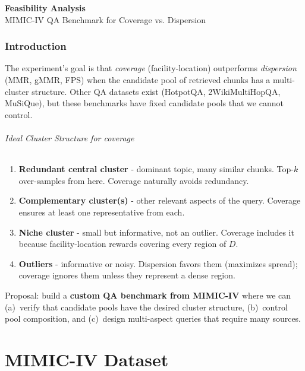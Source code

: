 \documentclass[11pt,a4paper]{article}
\begin{document}
\begin{center}
	{\huge \textbf{Feasibility Analysis}}\\[1em]
	{\Large MIMIC-IV QA Benchmark for Coverage vs. Dispersion}\\[4em]
\end{center}

\tableofcontents
\newpage

\section{Introduction}
\label{sec:introduction}

The experiment's goal is that \emph{coverage} (facility-location) outperforms \emph{dispersion} (MMR, gMMR, FPS) when the candidate pool of retrieved chunks has a multi-cluster structure. Other QA datasets exist (HotpotQA, 2WikiMultiHopQA, MuSiQue), but these benchmarks have fixed candidate pools that we cannot control.

\paragraph{Ideal Cluster Structure for coverage}
\begin{enumerate}[leftmargin=*]
	\item \textbf{Redundant central cluster} - dominant topic, many similar chunks. Top-$k$ over-samples from here.  Coverage naturally avoids redundancy.
	\item \textbf{Complementary cluster(s)} - other relevant aspects of the query. Coverage ensures at least one representative from each.
	\item \textbf{Niche cluster} - small but informative, not an outlier. Coverage includes it because facility-location rewards covering every region of $D$.
	\item \textbf{Outliers} - informative or noisy.  Dispersion favors them (maximizes spread); coverage ignores them unless they represent a dense region.
\end{enumerate}

Proposal: build a \textbf{custom QA benchmark from MIMIC-IV} where we can (a)~verify that candidate pools have the desired cluster structure, (b)~control pool composition, and (c)~design multi-aspect queries that require many sources.

\part{MIMIC-IV Dataset}
\label{sec:data}
\end{document}
